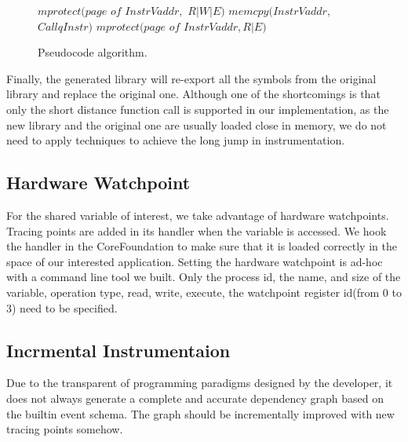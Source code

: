 \begin{figure}
    \begin{algorithmic}[1]
        \State $mprotect(page$ $of$ $InstrVaddr,$ $R|W|E)$
        \State $memcpy(InstrVaddr,$ $CallqInstr)$
        \State $mprotect(page$ $of$ $InstrVaddr, R|E)$
        \EndFor
        \EndProcedure
    \end{algorithmic}
    \label{fig:pseudo-code}
    \caption{Pseudocode algorithm.}
\end{figure}

Finally, the generated library will re-export all the symbols from the original library and replace the original one.
Although one of the shortcomings is that only the short distance function call is supported in our implementation, as the new library and the original one are usually loaded close in memory, we do not need to apply techniques to achieve the long jump in instrumentation.
\subsection{Hardware Watchpoint}
For the shared variable of interest, we take advantage of hardware watchpoints.
Tracing points are added in its handler when the variable is accessed.
We hook the handler in the CoreFoundation to make sure that it is loaded correctly in the space of our interested application.
Setting the hardware watchpoint is ad-hoc with a command line tool we built.
Only the process id, the name, and size of the variable, operation type, read, write, execute, the watchpoint register id(from 0 to 3) need to be specified.

\subsection{Incrmental Instrumentaion}
Due to the transparent of programming paradigms designed by the developer, it does not always generate a complete and accurate dependency graph based on the builtin event schema.
The graph should be incrementally improved with new tracing points somehow.


